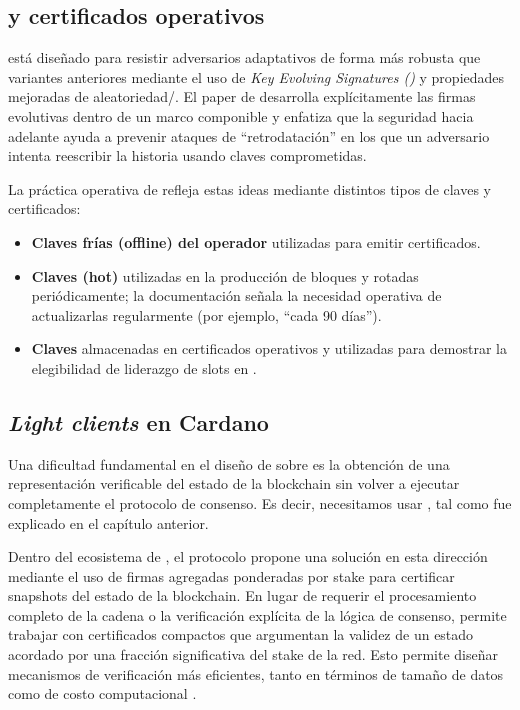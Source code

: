 \subsection{\KES y certificados operativos}

\Praos está diseñado para resistir adversarios adaptativos de forma más robusta que variantes anteriores mediante el uso de \emph{Key Evolving Signatures (\KES)} y propiedades mejoradas de aleatoriedad/\VRF. El paper de \Praos desarrolla explícitamente las firmas evolutivas dentro de un marco componible y enfatiza que la seguridad hacia adelante ayuda a prevenir ataques de ``retrodatación'' en los que un adversario intenta reescribir la historia usando claves comprometidas.

La práctica operativa de \Cardano refleja estas ideas mediante distintos tipos de claves y certificados:

\begin{itemize}
	\item \textbf{Claves frías (offline) del operador} utilizadas para emitir certificados.
	\item \textbf{Claves \KES (hot)} utilizadas en la producción de bloques y rotadas periódicamente; la documentación señala la necesidad operativa de actualizarlas regularmente (por ejemplo, ``cada 90 días'').
	\item \textbf{Claves \VRF} almacenadas en certificados operativos y utilizadas para demostrar la elegibilidad de liderazgo de slots en \Praos.
\end{itemize}

\subsection{\textit{Light clients} en Cardano}

Una dificultad fundamental en el diseño de \Bridges sobre \Cardano es la obtención de una representación verificable del estado de la blockchain sin volver a ejecutar completamente el protocolo de consenso. Es decir, necesitamos usar \LightClients, tal como fue explicado en el capítulo anterior.

Dentro del ecosistema de \Cardano, el protocolo \Mithril \cite{cryptoeprint:2021/916} propone una solución en esta dirección mediante el uso de firmas agregadas ponderadas por stake para certificar snapshots del estado de la blockchain. En lugar de requerir el procesamiento completo de la cadena o la verificación explícita de la lógica de consenso, \Mithril permite trabajar con certificados compactos que argumentan la validez de un estado acordado por una fracción significativa del stake de la red. Esto permite diseñar mecanismos de verificación más eficientes, tanto en términos de tamaño de datos como de costo computacional \Onchain.

